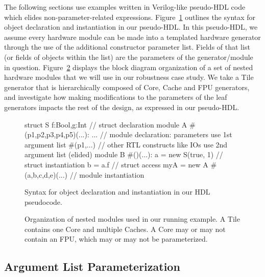 The following sections use examples written in Verilog-like pseudo-HDL code which elides non-parameter-related expressions.
Figure~\ref{fig:phdl} outlines the syntax for object declaration and instantiation in our pseudo-HDL.
In this pseudo-HDL, we assume every hardware module can be made into a templated hardware generator through the use of the additional \code{\#()} constructor parameter list.
Fields of that list (or fields of objects within the list) are the parameters of the generator/module in question.
Figure~\ref{fig:block} displays the block diagram organization of a set of nested hardware modules that we will use in our robustness case study.
We take a Tile generator that is hierarchically composed of Core, Cache and FPU generators, and investigate how making modifications to the parameters
of the leaf generators impacts the rest of the design, as expressed in our pseudo-HDL.

\begin{figure}
\centering
\begin{phdl}
struct S {f:Bool,g:Int}          // struct declaration
module A #(p1,p2,p3,p4,p5)(...): ... 
   // module declaration: parameters use 1st argument list #(p1,...)
   // other RTL constructs like IOs use 2nd argument list (elided)
module B #()(...):
  a = new S(true, 1)             // struct instantiation
  b = a.f                        // struct access
  myA = new A #(a,b,c,d,e)(...)  // module instantiation
\end{phdl} 
\caption{Syntax for object declaration and instantiation in our HDL pseudocode.}
\label{fig:phdl}
\end{figure}

\begin{figure}
\centering
{}
\caption{Organization of nested modules used in our running example.
A Tile contains one Core and multiple Caches.
A Core may or may not contain an FPU, which may or may not be parameterized.}
\label{fig:block}
\end{figure}

\subsection{Argument List Parameterization}

